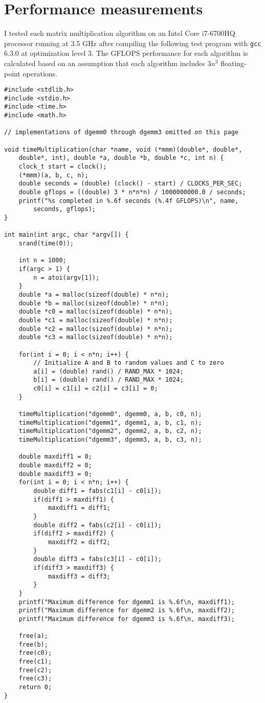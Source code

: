 \documentclass[12pt,letterpaper,oneside]{article}
\begin{document}
\section*{Performance measurements}

I tested each matrix multiplication algorithm on an \label{specs} Intel Core i7-6700HQ processor running at 3.5 GHz after compiling
the following test program with \texttt{gcc} 6.3.0 at optimization level 3. The GFLOPS performance for each algorithm
is calculated based on an assumption that each algorithm includes $3n^3$ floating-point operations.

\begin{verbatim}
#include <stdlib.h>
#include <stdio.h>
#include <time.h>
#include <math.h>

// implementations of dgemm0 through dgemm3 omitted on this page

void timeMultiplication(char *name, void (*mmm)(double*, double*,
    double*, int), double *a, double *b, double *c, int n) {
    clock_t start = clock();
    (*mmm)(a, b, c, n);
    double seconds = (double) (clock() - start) / CLOCKS_PER_SEC;
    double gflops = ((double) 3 * n*n*n) / 1000000000.0 / seconds;
    printf("%s completed in %.6f seconds (%.4f GFLOPS)\n", name,
        seconds, gflops);
}

int main(int argc, char *argv[]) {
    srand(time(0));

    int n = 1000;
    if(argc > 1) {
        n = atoi(argv[1]);
    }
    double *a = malloc(sizeof(double) * n*n);
    double *b = malloc(sizeof(double) * n*n);
    double *c0 = malloc(sizeof(double) * n*n);
    double *c1 = malloc(sizeof(double) * n*n);
    double *c2 = malloc(sizeof(double) * n*n);
    double *c3 = malloc(sizeof(double) * n*n);

    for(int i = 0; i < n*n; i++) { 
        // Initialize A and B to random values and C to zero
        a[i] = (double) rand() / RAND_MAX * 1024;
        b[i] = (double) rand() / RAND_MAX * 1024;
        c0[i] = c1[i] = c2[i] = c3[i] = 0;
    }

    timeMultiplication("dgemm0", dgemm0, a, b, c0, n);
    timeMultiplication("dgemm1", dgemm1, a, b, c1, n);
    timeMultiplication("dgemm2", dgemm2, a, b, c2, n);
    timeMultiplication("dgemm3", dgemm3, a, b, c3, n);

    double maxdiff1 = 0;
    double maxdiff2 = 0;
    double maxdiff3 = 0;
    for(int i = 0; i < n*n; i++) {
        double diff1 = fabs(c1[i] - c0[i]);
        if(diff1 > maxdiff1) {
            maxdiff1 = diff1;
        }
        double diff2 = fabs(c2[i] - c0[i]);
        if(diff2 > maxdiff2) {
            maxdiff2 = diff2;
        }
        double diff3 = fabs(c3[i] - c0[i]);
        if(diff3 > maxdiff3) {
            maxdiff3 = diff3;
        }
    }
    printf("Maximum difference for dgemm1 is %.6f\n, maxdiff1);
    printf("Maximum difference for dgemm2 is %.6f\n, maxdiff2);
    printf("Maximum difference for dgemm3 is %.6f\n, maxdiff3);

    free(a);
    free(b);
    free(c0);
    free(c1);
    free(c2);
    free(c3);
    return 0;
}
\end{verbatim}
\end{document}
